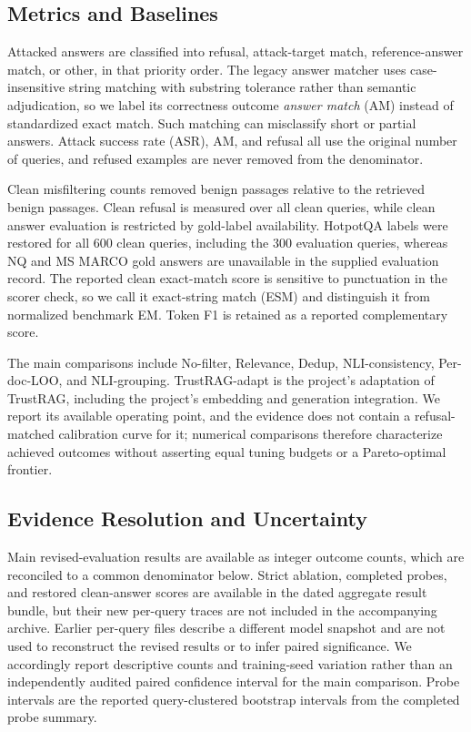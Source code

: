 \documentclass[sigconf]{aamas}
\begin{document}
\subsection{Metrics and Baselines}
Attacked answers are classified into refusal, attack-target match, reference-answer match, or other, in that priority order. The legacy answer matcher uses case-insensitive string matching with substring tolerance rather than semantic adjudication, so we label its correctness outcome \emph{answer match} (AM) instead of standardized exact match. Such matching can misclassify short or partial answers. Attack success rate (ASR), AM, and refusal all use the original number of queries, and refused examples are never removed from the denominator.

Clean misfiltering counts removed benign passages relative to the retrieved benign passages. Clean refusal is measured over all clean queries, while clean answer evaluation is restricted by gold-label availability. HotpotQA labels were restored for all 600 clean queries, including the 300 evaluation queries, whereas NQ and MS MARCO gold answers are unavailable in the supplied evaluation record. The reported clean exact-match score is sensitive to punctuation in the scorer check, so we call it exact-string match (ESM) and distinguish it from normalized benchmark EM. Token F1 is retained as a reported complementary score.

The main comparisons include No-filter, Relevance, Dedup, NLI-consistency, Per-doc-LOO, and NLI-grouping. TrustRAG-adapt is the project's adaptation of TrustRAG, including the project's embedding and generation integration. We report its available operating point, and the evidence does not contain a refusal-matched calibration curve for it; numerical comparisons therefore characterize achieved outcomes without asserting equal tuning budgets or a Pareto-optimal frontier.

\subsection{Evidence Resolution and Uncertainty}
Main revised-evaluation results are available as integer outcome counts, which are reconciled to a common denominator below. Strict ablation, completed probes, and restored clean-answer scores are available in the dated aggregate result bundle, but their new per-query traces are not included in the accompanying archive. Earlier per-query files describe a different model snapshot and are not used to reconstruct the revised results or to infer paired significance. We accordingly report descriptive counts and training-seed variation rather than an independently audited paired confidence interval for the main comparison. Probe intervals are the reported query-clustered bootstrap intervals from the completed probe summary.
\end{document}
